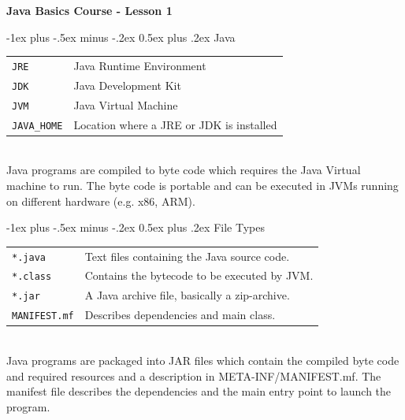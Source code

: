 \documentclass[10pt,landscape]{article}
\makeatletter
\renewcommand{\section}{\@startsection{section}{1}{0mm}%
                                {-1ex plus -.5ex minus -.2ex}%
                                {0.5ex plus .2ex}%
                                {\normalfont\large\bfseries}}
\makeatother
\begin{document}
\raggedright
\footnotesize
\begin{multicols}{2}


\setlength{\premulticols}{1pt}
\setlength{\postmulticols}{1pt}
\setlength{\multicolsep}{3pt}
\setlength{\columnsep}{2pt}

\begin{center}
     \Large{\textbf{Java Basics Course - Lesson 1}} \\
\end{center}

\section{Java}
\begin{tabular}{@{}ll@{}}
\verb!JRE!  & Java Runtime Environment \\
\verb!JDK!  & Java Development Kit\\
\verb!JVM!  & Java Virtual Machine\\
\verb!JAVA_HOME! & Location where a JRE or JDK is installed\\
\end{tabular}\\
Java programs are compiled to byte code which requires the Java Virtual machine to run. The byte code is portable and can be executed in JVMs running on different hardware (e.g. x86, ARM). 

\section{File Types}
\begin{tabular}{@{}ll@{}}
\verb!*.java!    & Text files containing the Java source code. \\
\verb!*.class!  & Contains the bytecode to be executed by JVM.  \\
\verb!*.jar! & A Java archive file, basically a zip-archive. \\
\verb!MANIFEST.mf!  & Describes dependencies and main class.  \\
\end{tabular}\\
Java programs are packaged into JAR files which contain the  compiled byte code and required resources and a description in META-INF/MANIFEST.mf. The manifest file describes the dependencies and the main entry point to launch the program.


\end{multicols}
\end{document}

